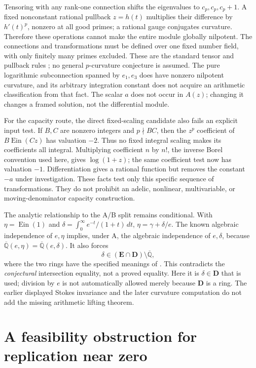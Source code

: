\documentclass[11pt,a4paper]{article}
\newcommand{\Qbar}{\overline{\mathbb Q}}
\newcommand{\Ein}{\operatorname{Ein}}
\theoremstyle{definition}
\theoremstyle{remark}
\numberwithin{equation}{section}
\begin{document}
Tensoring with any rank-one connection shifts the eigenvalues to
\(c_p,c_p,c_p+1\). A fixed nonconstant rational pullback \(z=h(t)\)
multiplies their difference by \(h'(t)^p\), nonzero at all good primes;
a rational gauge conjugates curvature. Therefore these operations
cannot make the entire module globally nilpotent. The connections and
transformations must be defined over one fixed number field, with
only finitely many primes excluded. These are the standard tensor and
pullback rules \cite{at:Katz1982}; no general \(p\)-curvature conjecture is
assumed. The pure logarithmic subconnection spanned by \(e_1,e_3\)
does have nonzero nilpotent curvature, and its arbitrary integration
constant does not acquire an arithmetic classification from that fact.
The scalar \(a\) does not occur in \(A(z)\); changing it changes a
framed solution, not the differential module.

For the capacity route, the direct fixed-scaling candidate also fails
an explicit input test. If \(B,C\) are nonzero integers and \(p\nmid BC\),
then the \(z^p\) coefficient of \(B\Ein(Cz)\) has valuation \(-2\).
Thus no fixed integral scaling makes its coefficients all integral.
Multiplying coefficient \(n\) by \(n!\), the inverse Borel convention
used here, gives \(\log(1+z)\); the same coefficient test now has
valuation \(-1\). Differentiation gives a rational function but removes
the constant \(-a\) under investigation. These facts test only this
specific sequence of transformations. They do not prohibit an adelic,
nonlinear, multivariable, or moving-denominator capacity construction.

The analytic relationship to the A/B split remains conditional. With
\(\eta=\Ein(1)\) and \(\delta=\int_0^\infty e^{-t}/(1+t)\,dt\),
\(\eta=\gamma+\delta/e\). The known algebraic independence of
\(e,\eta\) \cite{at:Rivoal2012} implies, under A, the algebraic independence
of \(e,\delta\), because
\(\Qbar(e,\eta)=\Qbar(e,\delta)\). It also forces
\[
 \delta\in(\mathbf E\cap\mathbf D)\setminus\Qbar,
\]
where the two rings have the specified meanings of
\cite{pm:FischlerRivoal2024}. This contradicts the \emph{conjectural}
intersection equality, not a proved equality. Here it is \(\delta\in
\mathbf D\) that is used; division by \(e\) is not automatically
allowed merely because \(\mathbf D\) is a ring. The earlier displayed
Stokes invariance and the later curvature computation do not add the
missing arithmetic lifting theorem.

\section{A feasibility obstruction for replication near zero}
\label{wr:sec-orbit-obstruction}
\end{document}
